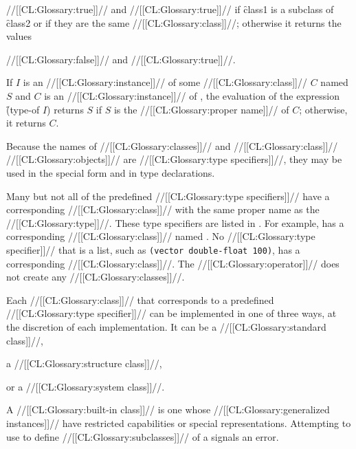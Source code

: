 //[[CL:Glossary:true]]// and //[[CL:Glossary:true]]// if \f{class1} is a subclass of \f{class2} or if they are the
same //[[CL:Glossary:class]]//; otherwise it returns the values 


//[[CL:Glossary:false]]// and //[[CL:Glossary:true]]//.









If  $I$ is an //[[CL:Glossary:instance]]// of some //[[CL:Glossary:class]]// $C$ named $S$ 
and $C$ is an //[[CL:Glossary:instance]]// of , 
the evaluation of the expression \f{(type-of $I$\/)} returns $S$ 
if $S$ is the //[[CL:Glossary:proper name]]// of $C$; 
otherwise, it returns $C$.

Because the names of //[[CL:Glossary:classes]]// 
and //[[CL:Glossary:class]]// //[[CL:Glossary:objects]]// are //[[CL:Glossary:type specifiers]]//, they may
be used in the special form  and in type declarations.
                                   
Many but not all of the predefined //[[CL:Glossary:type specifiers]]// have a
corresponding //[[CL:Glossary:class]]// with 
the same proper name as the //[[CL:Glossary:type]]//.  These type
specifiers are listed in \figref\ClassTypeCorrespondence.
For example,  has 
a corresponding //[[CL:Glossary:class]]// named .  
No //[[CL:Glossary:type specifier]]// that is a
list, such as {\tt (vector double-float 100)}, has a corresponding //[[CL:Glossary:class]]//.
The //[[CL:Glossary:operator]]//  does not create any //[[CL:Glossary:classes]]//.
                                            
Each //[[CL:Glossary:class]]// that corresponds to a predefined //[[CL:Glossary:type specifier]]// can
be implemented in one of three ways, at the discretion of each implementation.
It can be a //[[CL:Glossary:standard class]]//,


a //[[CL:Glossary:structure class]]//,



or a //[[CL:Glossary:system class]]//.





A //[[CL:Glossary:built-in class]]// is one whose //[[CL:Glossary:generalized instances]]// have restricted capabilities 
or special representations.  Attempting to use  to define 
//[[CL:Glossary:subclasses]]// of a  signals an error.

